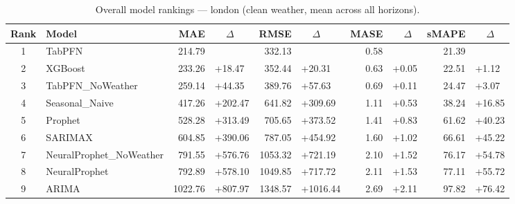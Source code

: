 \begin{table}[ht!]
\centering
\caption{Overall model rankings — london (clean weather, mean across all horizons).}
\label{tab:overall_rankings_london}
{\small
\setlength{\tabcolsep}{3pt}
\scriptsize
\begin{tabular}{clrlrlrlrl}
\toprule
Rank & Model & MAE & ~~\(\Delta\) & RMSE & ~~\(\Delta\) & MASE & ~~\(\Delta\) & sMAPE & ~~\(\Delta\) \\
\midrule
1 & TabPFN & 214.79 &  & 332.13 &  & 0.58 &  & 21.39 &  \\
2 & XGBoost & 233.26 & +18.47 & 352.44 & +20.31 & 0.63 & +0.05 & 22.51 & +1.12 \\
3 & TabPFN_NoWeather & 259.14 & +44.35 & 389.76 & +57.63 & 0.69 & +0.11 & 24.47 & +3.07 \\
4 & Seasonal_Naive & 417.26 & +202.47 & 641.82 & +309.69 & 1.11 & +0.53 & 38.24 & +16.85 \\
5 & Prophet & 528.28 & +313.49 & 705.65 & +373.52 & 1.41 & +0.83 & 61.62 & +40.23 \\
6 & SARIMAX & 604.85 & +390.06 & 787.05 & +454.92 & 1.60 & +1.02 & 66.61 & +45.22 \\
7 & NeuralProphet_NoWeather & 791.55 & +576.76 & 1053.32 & +721.19 & 2.10 & +1.52 & 76.17 & +54.78 \\
8 & NeuralProphet & 792.89 & +578.10 & 1049.85 & +717.72 & 2.11 & +1.53 & 77.11 & +55.72 \\
9 & ARIMA & 1022.76 & +807.97 & 1348.57 & +1016.44 & 2.69 & +2.11 & 97.82 & +76.42 \\
\bottomrule
\end{tabular}
}
\end{table}

